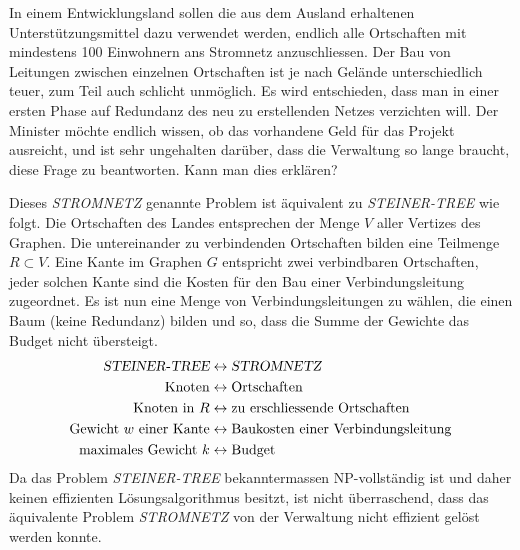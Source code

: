 In einem Entwicklungsland sollen die aus dem Ausland erhaltenen
Unterstützungsmittel dazu verwendet werden, endlich alle Ortschaften
mit mindestens 100 Einwohnern ans Stromnetz anzuschliessen.
Der Bau von Leitungen zwischen einzelnen Ortschaften ist je nach
Gelände unterschiedlich teuer, zum Teil auch schlicht unmöglich.
Es wird entschieden, dass man in einer ersten Phase auf Redundanz des
neu zu erstellenden Netzes verzichten will.
Der Minister möchte endlich wissen,
ob das vorhandene Geld für das Projekt ausreicht, und ist sehr ungehalten
darüber, dass die Verwaltung so lange braucht, diese Frage zu beantworten.
Kann man dies erklären?


\begin{loesung}
Dieses \textsl{STROMNETZ} genannte Problem ist äquivalent zu
\textsl{STEINER-TREE} wie folgt.
Die Ortschaften des Landes entsprechen der Menge $V$ aller Vertizes des
Graphen. Die untereinander zu verbindenden Ortschaften bilden eine Teilmenge
$R\subset V$.
Eine Kante im Graphen $G$ entspricht zwei verbindbaren Ortschaften,
jeder solchen Kante sind die Kosten für den Bau einer Verbindungsleitung
zugeordnet.
Es ist nun eine Menge von Verbindungsleitungen zu wählen, die einen Baum
(keine Redundanz) bilden und so, dass die Summe der Gewichte das 
Budget nicht übersteigt.
\begin{align*}
\textsl{STEINER-TREE}&\leftrightarrow\textsl{STROMNETZ}\\
\text{Knoten}&\leftrightarrow\text{Ortschaften}\\
\text{Knoten in $R$}&\leftrightarrow\text{zu erschliessende Ortschaften}\\
\text{Gewicht $w$ einer Kante}&\leftrightarrow \text{Baukosten einer Verbindungsleitung}\\
\text{maximales Gewicht $k$}&\leftrightarrow\text{Budget}
\end{align*}
Da das Problem \textsl{STEINER-TREE} bekanntermassen NP-vollständig ist
und daher keinen effizienten Lösungsalgorithmus besitzt, ist nicht
überraschend, dass das äquivalente Problem \textsl{STROMNETZ} von
der Verwaltung nicht effizient gelöst werden konnte.
\end{loesung}

